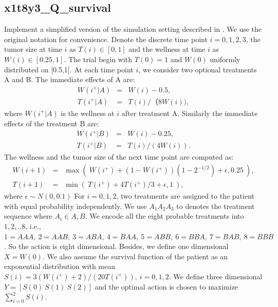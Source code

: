 \documentclass[12pt]{article}
\begin{document}
\subsection*{x1t8y3\_Q\_survival}
Implement a simplified version of the simulation setting described in \cite{goldberg2012q}. We use the original notation for convenience. Denote the discrete time point $i=0,1,2,3$, the tumor size at time $i$ as $T(i) \in [0,1]$ and the wellness at time $i$ as $W(i)\in [0.25,1]$. The trial begin with $T(0)=1$ and $W(0)$ uniformly distributed on [0.5,1]. At each time point $i$, we consider two optional treatments A and B. The immediate effects of A are:
\begin{eqnarray}
W(i^+|A)&=&W(i)-0.5,\\
T(i^+|A)&=&T(i)/（8W(i)),
\end{eqnarray}
where $W(i^+|A)$ is the wellness at $i$ after treatment A. Similarly the immediate effects of the treatment B are:
\begin{eqnarray}
W(i^+|B)&=&W(i)-0.25,\\
T(i^+|B)&=&T(i)/(4W(i)).
\end{eqnarray}
The wellness and the tumor size of the next time point are computed as:
\begin{eqnarray}
W(i+1)&=&\max(~W(i^+)+(1-W(i^+))(1-2^{-1/2})+\epsilon,0.25~),\\
T(i+1)&=&\min(~T(i^+)+4T(i^+)/3+\epsilon,1~),
\end{eqnarray}
where $\epsilon \sim N(0,0.1)$
For $i=0,1,2$, two treatments are assigned to the patient with equal probability independently. We use $A_1A_2A_3$ to denotes the treatment sequence where $A_i\in {A,B}$. We encode all the eight probable treatments into $1,2,..8$, i.e., $1=AAA,~2=AAB,~3=ABA,~4=BAA,~5=ABB,~6=BBA,~7=BAB,~8=BBB$. So the action is eight dimensional. Besides, we define one dimensional $X=W(0)$. We also assume the survival function of the patient as an exponential distribution with mean $S(i)=3(W(i^+)+2)/(20T(i^+)),~ i=0,1,2$. We define three dimensional $Y=[S(0)~S(1)~S(2)]$ and the optimal action is chosen to maximize $\sum_{i=0}^2 S(i)$.






\newpage
\end{document}
